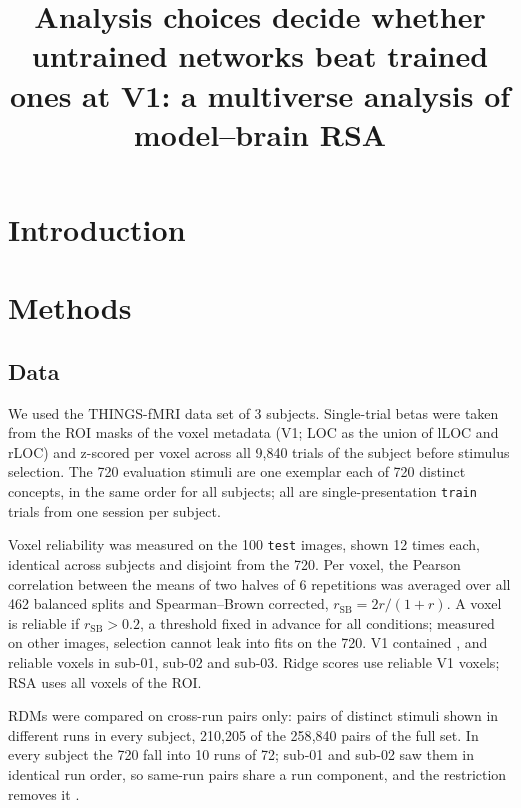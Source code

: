 \documentclass[10pt]{article}
\title{Analysis choices decide whether untrained networks beat trained ones at V1: a multiverse analysis of model--brain RSA}
\author{}
\date{}
\begin{document}
\maketitle

\begin{abstract}

\end{abstract}

\section{Introduction}


\section{Methods}
\subsection{Data}
\label{sec:data}

We used the THINGS-fMRI data set \citep{hebart2023} of 3 subjects. Single-trial
betas were taken from the ROI masks of the voxel metadata (V1; LOC as the union of lLOC
and rLOC) and z-scored per voxel across all 9{,}840 trials of the subject before stimulus
selection. The 720 evaluation stimuli are one exemplar each of 720 distinct concepts,
in the same order for all subjects; all are single-presentation \texttt{train} trials
from one session per subject.

Voxel reliability was measured on the 100 \texttt{test} images, shown 12 times each,
identical across subjects and disjoint from the 720. Per voxel, the Pearson
correlation between the means of two halves of 6 repetitions was averaged over all 462
balanced splits and Spearman--Brown corrected, $r_{\mathrm{SB}} = 2r/(1+r)$. A voxel is
reliable if $r_{\mathrm{SB}} > 0.2$, a threshold fixed in advance for all conditions;
measured on other images, selection cannot leak into fits on the 720. V1 contained \NReliableSubOne,
\NReliableSubTwo{} and \NReliableSubThree{} reliable voxels in sub-01, sub-02 and
sub-03. Ridge scores use reliable V1 voxels; RSA uses all voxels of the ROI.

RDMs were compared on cross-run pairs only: pairs of distinct stimuli shown in different
runs in every subject, 210{,}205 of the 258{,}840 pairs of the full set. In every subject
the 720 fall into 10 runs of 72; sub-01 and sub-02 saw them in identical run order, so
same-run pairs share a run component, and the restriction removes it \citep{evalres}.
\end{document}
